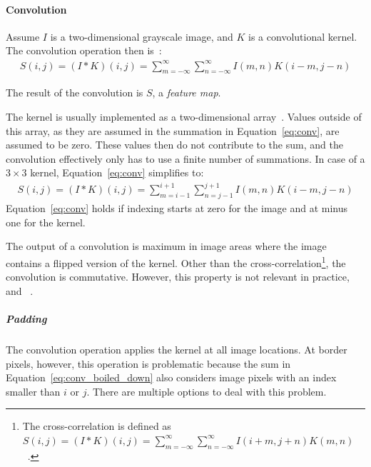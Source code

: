 \paragraph{Convolution}

Assume $I$ is a two-dimensional grayscale image, and $K$ is a convolutional kernel.
The convolution operation then is~\citep[p. 327]{Goodfellow-et-al-2016}:
\begin{align}
    S(i, j)=(I * K)(i, j)=\sum_{m=-\infty}^{\infty} \sum_{n=-\infty}^{\infty} I(m, n) K(i-m, j-n) \label{eq:conv}
\end{align}

The result of the convolution is $S$, a \textit{feature map}.

The kernel is usually implemented as a two-dimensional array~\citep[p. 327]{Goodfellow-et-al-2016}.
Values outside of this array, as they are assumed in the summation in Equation~\ref{eq:conv}, are assumed to be zero.
These values then do not contribute to the sum, and the convolution effectively only has to use a finite number of summations.
In case of a $3\times 3$ kernel, Equation~\ref{eq:conv} simplifies to:
\begin{align}
    S(i, j)=(I * K)(i, j)=\sum_{m=i-1}^{i+1} \sum_{n=j-1}^{j+1} I(m, n) K(i-m, j-n) \label{eq:conv_boiled_down}
\end{align}
Equation~\ref{eq:conv} holds if indexing starts at zero for the image and at minus one for the kernel.

The output of a convolution is maximum in image areas where the image contains a flipped version of the kernel.
Other than the cross-correlation\footnote{The cross-correlation is defined as $S(i, j)=(I * K)(i, j)=\sum_{m=-\infty}^{\infty} \sum_{n=-\infty}^{\infty} I(i+m, j+n) K(m, n)$~\citep[p. 329]{Goodfellow-et-al-2016}.}, the convolution is commutative.
However, this property is not relevant in practice, and ~\citep[p. 329]{Goodfellow-et-al-2016}.

\subparagraph{Padding}
The convolution operation applies the kernel at all image locations.
At border pixels, however, this operation is problematic because the sum in Equation~\ref{eq:conv_boiled_down} also considers image pixels with an index smaller than $i$ or $j$.
There are multiple options to deal with this problem.

